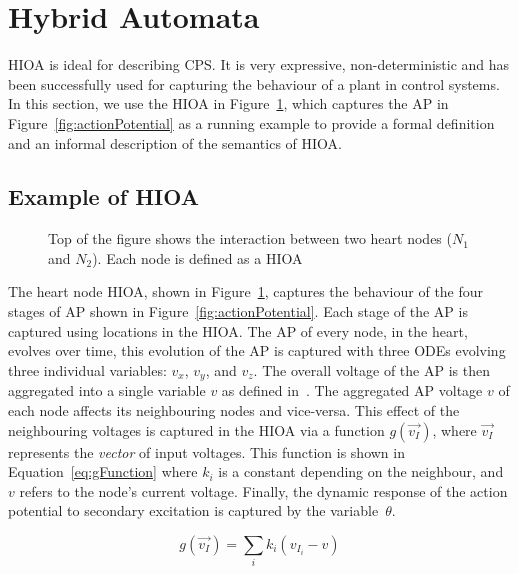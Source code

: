 \section{Hybrid Automata}
\label{sec:HA}

\acf{HIOA} is ideal for describing \ac{CPS}. It is very expressive,
non-deterministic and has been successfully used for capturing the
behaviour of a plant in control systems. In this section, we use the
\ac{HIOA} in Figure~\ref{fig:heartCellHA}, which captures the \ac{AP} in
Figure~\ref{fig:actionPotential} as a running example to provide a
formal definition and an informal description of the semantics of
\ac{HIOA}.

\subsection{Example of \acf{HIOA} }

\begin{figure}
  \centering 
  \caption{Top of the figure shows the interaction between two heart nodes 
    ($N_1$ and $N_2$). Each node is defined as a \acf{HIOA} 
    \label{fig:heartCellHA}}
\vspace{-0.2cm}
\end{figure}

The heart node \ac{HIOA}, shown in Figure~\ref{fig:heartCellHA}, captures the
behaviour of the four stages of \ac{AP} shown in
Figure~\ref{fig:actionPotential}. Each stage of the \ac{AP} is captured
using locations in the \ac{HIOA}. The \ac{AP} of every node, in
the heart, evolves over time, this evolution of the \ac{AP} is captured
with three \acfp{ODE} evolving three individual variables: $v_{x}$,
$v_{y}$, and $v_{z}$. The overall voltage of the \ac{AP}
is then aggregated into a single variable $v$ as defined
in~\cite{YeESG08}. The aggregated \ac{AP} voltage $v$ of each node
affects its neighbouring nodes and vice-versa. This effect of the
neighbouring voltages is captured in the \ac{HIOA} via a function
$g(\vec{v_{I}})$, where $\vec{v_{I}}$ represents the \emph{vector} of input
voltages. This function is shown in Equation~\ref{eq:gFunction} where 
$k_{i}$ is a constant depending on the neighbour, and $v$ refers to the node's 
current voltage.  Finally, the dynamic response of the action potential to 
secondary excitation is captured by the variable~$\theta$.

\begin{equation}
g(\vec{v_{I}}) = \sum_{i} k_{i}(v_{I_{i}} - v)
\label{eq:gFunction}
\end{equation}

